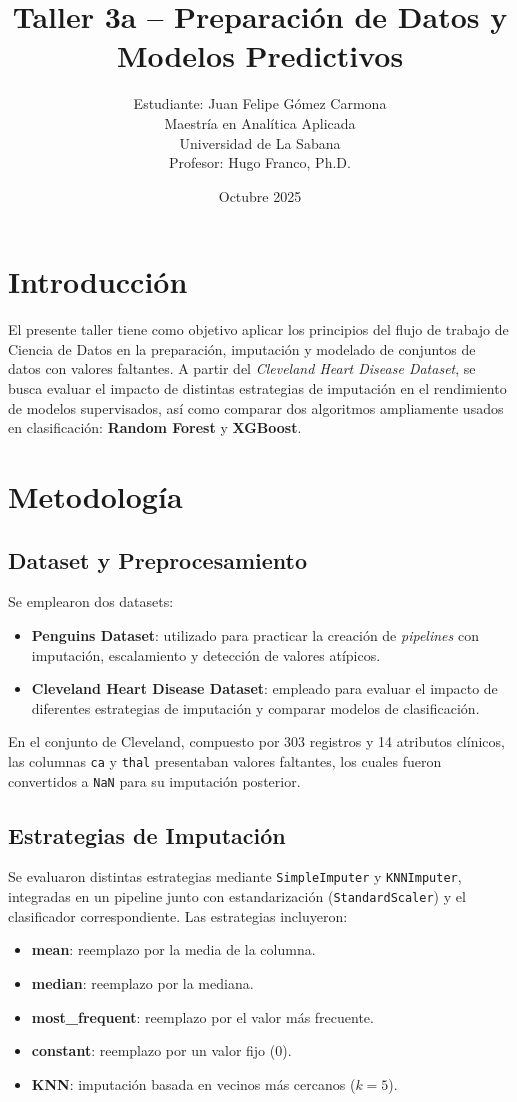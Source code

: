\documentclass[12pt]{article}
\title{Taller 3a – Preparación de Datos y Modelos Predictivos}
\author{Estudiante: Juan Felipe Gómez Carmona \\ 
Maestría en Analítica Aplicada \\
Universidad de La Sabana \\ 
Profesor: Hugo Franco, Ph.D.}
\date{Octubre 2025}
\begin{document}
\maketitle
\tableofcontents
\newpage

\section{Introducción}
El presente taller tiene como objetivo aplicar los principios del flujo de trabajo de Ciencia de Datos en la preparación, imputación y modelado de conjuntos de datos con valores faltantes. 
A partir del \textit{Cleveland Heart Disease Dataset}, se busca evaluar el impacto de distintas estrategias de imputación en el rendimiento de modelos supervisados, así como comparar dos algoritmos ampliamente usados en clasificación: \textbf{Random Forest} y \textbf{XGBoost}.

\section{Metodología}

\subsection{Dataset y Preprocesamiento}
Se emplearon dos datasets:
\begin{itemize}
    \item \textbf{Penguins Dataset}: utilizado para practicar la creación de \textit{pipelines} con imputación, escalamiento y detección de valores atípicos.
    \item \textbf{Cleveland Heart Disease Dataset}: empleado para evaluar el impacto de diferentes estrategias de imputación y comparar modelos de clasificación.
\end{itemize}

En el conjunto de Cleveland, compuesto por 303 registros y 14 atributos clínicos, las columnas \texttt{ca} y \texttt{thal} presentaban valores faltantes, los cuales fueron convertidos a \texttt{NaN} para su imputación posterior.  

\subsection{Estrategias de Imputación}
Se evaluaron distintas estrategias mediante \texttt{SimpleImputer} y \texttt{KNNImputer}, integradas en un pipeline junto con estandarización (\texttt{StandardScaler}) y el clasificador correspondiente.  
Las estrategias incluyeron:
\begin{itemize}
    \item \textbf{mean}: reemplazo por la media de la columna.
    \item \textbf{median}: reemplazo por la mediana.
    \item \textbf{most\_frequent}: reemplazo por el valor más frecuente.
    \item \textbf{constant}: reemplazo por un valor fijo (0).
    \item \textbf{KNN}: imputación basada en vecinos más cercanos ($k=5$).
\end{itemize}
\end{document}
